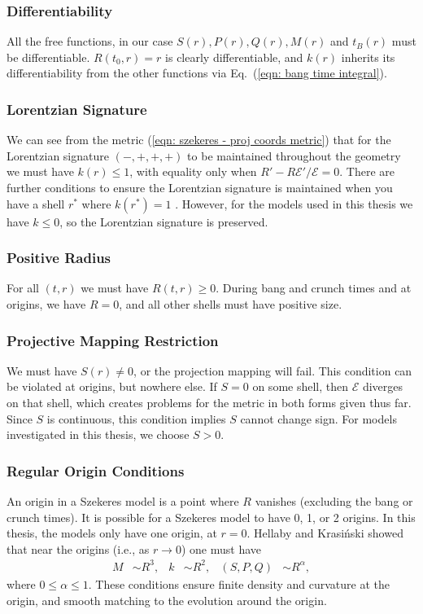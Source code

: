 \documentclass[a4paper,12pt]{report}
\renewcommand{\eqref}[1]{Eq.~({#1})}
\begin{document}
\subsubsection{Differentiability}
All the free functions, in our case $S(r), P(r), Q(r), M(r)$ and $t_B(r)$ must be differentiable. $R(t_0,r)=r$ is clearly differentiable, and $k(r)$ inherits its differentiability from the other functions via \eqref{\ref{eqn: bang time integral}}.

\subsubsection{Lorentzian Signature}
We can see from the metric (\ref{eqn: szekeres - proj coords metric}) that for the Lorentzian signature $(-,+,+,+)$ to be maintained throughout the geometry we must have $k(r)\leq 1$, with equality only when $R'-R\mathcal{E}'/\mathcal{E} = 0$. There are further conditions to ensure the Lorentzian signature is maintained when you have a shell $r^*$ where $k(r^*)=1$ \cite{RN143}. However, for the models used in this thesis we have $k\leq 0$, so the Lorentzian signature is preserved.

\subsubsection{Positive Radius}
For all $(t,r)$ we must have $R(t,r) \geq 0$. During bang and crunch times and at origins, we have $R=0$, and all other shells must have positive size.

\subsubsection{Projective Mapping Restriction}
We must have $S(r) \neq 0$, or the projection mapping will fail. This condition can be violated at origins, but nowhere else. If $S = 0$ on some shell, then $\mathcal{E}$ diverges on that shell, which creates problems for the metric in both forms given thus far. Since $S$ is continuous, this condition implies $S$ cannot change sign. For models investigated in this thesis, we choose $S > 0$.

\subsubsection{Regular Origin Conditions}
An origin in a Szekeres model is a point where $R$ vanishes (excluding the bang or crunch times). It is possible for a Szekeres model to have 0, 1, or 2 origins. In this thesis, the models only have one origin, at $r=0$. Hellaby and Krasi\'nski \cite{RN143} showed that near the origins (i.e., as $r \to 0$) one must have
\begin{align} \label{eqn: szekeres - regular origin conditions}
  M &\sim R^3, & k &\sim R^2, & (S,P,Q) &\sim R^\alpha,
\end{align}
where $0 \leq \alpha \leq 1$. These conditions ensure finite density and curvature at the origin, and smooth matching to the evolution around the origin.
\end{document}
